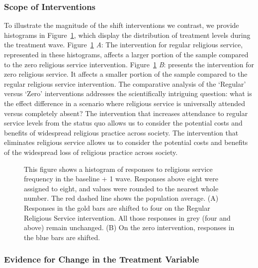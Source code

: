 \documentclass[
  single column]{article}
\begin{document}
\subsubsection{Scope of Interventions}\label{scope-of-interventions}

To illustrate the magnitude of the shift interventions we contrast, we
provide histograms in Figure~\ref{fig-hist}, which display the
distribution of treatment levels during the treatment wave.
Figure~\ref{fig-hist} \emph{A}: The intervention for regular religious
service, represented in these histograms, affects a larger portion of
the sample compared to the zero religious service intervention.
Figure~\ref{fig-hist} \emph{B}: presents the intervention for zero
religious service. It affects a smaller portion of the sample compared
to the regular religious service intervention. The comparative analysis
of the `Regular' versus `Zero' interventions addresses the
scientifically intriguing question: what is the effect difference in a
scenario where religious service is universally attended versus
completely absent? The intervention that increases attendance to regular
service levels from the status quo allows us to consider the potential
costs and benefits of widespread religious practice across society. The
intervention that eliminates religious service allows us to consider the
potential costs and benefits of the widespread loss of religious
practice across society.

\begin{figure}


\caption{\label{fig-hist}This figure shows a histogram of responses to
religious service frequency in the baseline + 1 wave. Responses above
eight were assigned to eight, and values were rounded to the nearest
whole number. The red dashed line shows the population average. (A)
Responses in the gold bars are shifted to four on the Regular Religious
Service intervention. All those responses in grey (four and above)
remain unchanged. (B) On the zero intervention, responses in the blue
bars are shifted.}

\end{figure}%

\newpage{}

\subsubsection{Evidence for Change in the Treatment
Variable}\label{evidence-for-change-in-the-treatment-variable}
\end{document}
